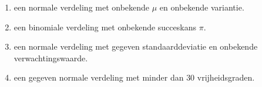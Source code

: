 \begin{enumerate}[label=(\alph*)]
    \item een normale verdeling met onbekende $\mu$ en onbekende variantie.
    \item een binomiale verdeling met onbekende succeskans $\pi$.
    \item een normale verdeling met gegeven standaarddeviatie en onbekende verwachtingswaarde.
    \item een gegeven normale verdeling met minder dan $30$ vrijheidsgraden.
\end{enumerate}
\answer{
    
}